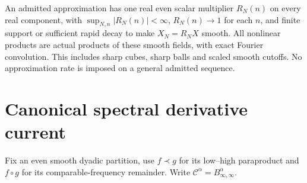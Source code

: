 \documentclass[11pt]{article}
\begin{document}
An admitted approximation has one real even scalar multiplier $R_N(n)$
on every real component, with $\sup_{N,n}|R_N(n)|<\infty$,
$R_N(n)\to1$ for each $n$, and finite support or sufficient rapid decay
to make $X_N=R_NX$ smooth. All nonlinear products are actual products
of these smooth fields, with exact Fourier convolution. This includes
sharp cubes, sharp balls and scaled smooth cutoffs. No approximation rate
is imposed on a general admitted sequence.

\section{Canonical spectral derivative current}
Fix an even smooth dyadic partition, use $f\prec g$ for its low--high
paraproduct and $f\circ g$ for its comparable-frequency remainder.
Write $\mathcal C^\alpha=B^\alpha_{\infty,\infty}$.
\end{document}
